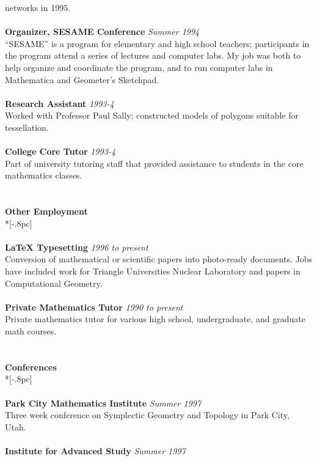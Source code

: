 networks in 1995. \\
\\
{\bf Organizer, SESAME Conference} \hfill {\it Summer 1994\/} \\
``SESAME'' is a program for elementary and high school teachers; 
participants in the program attend a series of lectures and computer 
labs.  My job was both to help organize and coordinate the program, and to 
run computer labs in Mathematica and Geometer's Sketchpad. \\
\\
{\bf Research Assistant} \hfill {\it 1993-4\/} \\
Worked with Professor Paul Sally; constructed models of
polygons suitable for tessellation. \\
\\
{\bf College Core Tutor} \hfill {\it 1993-4\/} \\
Part of university tutoring staff that provided  
assistance to students in the core mathematics classes. \\
\\
\\
{\large \bf Other Employment} \\*[-.8pc]
\underline{\hspace{6in}} \\
\\
{\bf LaTeX Typesetting} \hfill {\it 1996 to present\/} \\
Conversion of mathematical or scientific papers into photo-ready
documents.  Jobs have included work
for Triangle Universities Nuclear Laboratory and papers in 
Computational Geometry. \\
\\
{\bf Private Mathematics Tutor} \hfill {\it 1990 to present\/} \\
Private mathematics tutor for various high school, undergraduate,
and graduate math courses. \\
\\
\\
{\large \bf Conferences} \\*[-.8pc]
\underline{\hspace{6in}} \\
\\
{\bf Park City Mathematics Institute} \hfill {\it Summer 1997\/} \\
Three week conference on Symplectic Geometry and Topology in Park City, Utah. \\
\\
{\bf Institute for Advanced Study} \hfill {\it Summer 1997\/} \\
